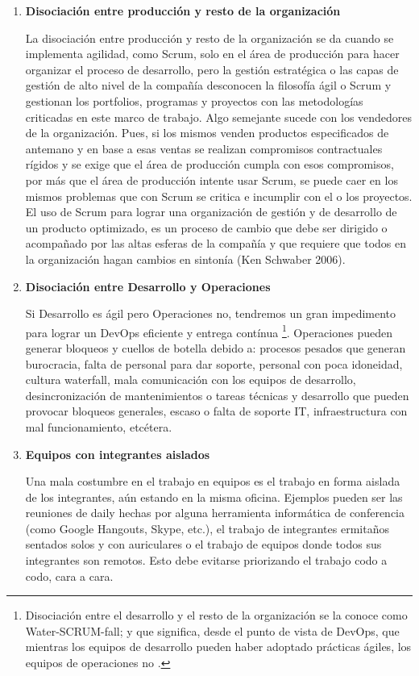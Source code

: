 \begin{enumerate}
\item \textbf{Disociación entre producción y resto de la organización}

La disociación entre producción y resto de la organización se da cuando se implementa agilidad, como Scrum, solo en el área de producción para hacer organizar el proceso de desarrollo, pero la gestión estratégica o las capas de gestión de alto nivel de la compañía desconocen la filosofía ágil o Scrum y gestionan los portfolios, programas y proyectos con las metodologías criticadas en este marco de trabajo. Algo semejante sucede con los vendedores de la organización. Pues, si los mismos venden productos especificados de antemano y en base a esas ventas se realizan compromisos contractuales rígidos y se exige que el área de producción cumpla con esos compromisos, por más que el área de producción intente usar Scrum, se puede caer en los mismos problemas que con Scrum se critica e incumplir con el o los proyectos. El uso de Scrum para lograr una organización de gestión y de desarrollo de un producto optimizado, es un proceso de cambio que debe ser dirigido o acompañado por las altas esferas de la compañía y que requiere que todos en la organización hagan cambios en sintonía (Ken Schwaber 2006).

\item \textbf{Disociación entre Desarrollo y Operaciones}

Si Desarrollo es ágil pero Operaciones no, tendremos un gran impedimento para lograr un DevOps eficiente y entrega contínua \footnote{Disociación entre el desarrollo y el resto de la organización se la conoce como Water-SCRUM-fall; y que significa, desde el punto de vista de DevOps, que mientras los equipos de desarrollo pueden haber adoptado prácticas ágiles, los equipos de operaciones no \cite{DevOps-for-dummies-2015}.}. Operaciones pueden generar bloqueos y cuellos de botella debido a: procesos pesados que generan burocracia, falta de personal para dar soporte, personal con poca idoneidad, cultura waterfall, mala comunicación con los equipos de desarrollo, desincronización de mantenimientos o tareas técnicas y desarrollo que pueden provocar bloqueos generales, escaso o falta de soporte IT, infraestructura con mal funcionamiento, etcétera.

\item \textbf{Equipos con integrantes aislados}

Una mala costumbre en el trabajo en equipos es el trabajo en forma aislada de los integrantes, aún estando en la misma oficina. Ejemplos pueden ser las reuniones de daily hechas por alguna herramienta informática de conferencia (como Google Hangouts, Skype, etc.), el trabajo de integrantes ermitaños sentados solos y con auriculares o el trabajo de equipos donde todos sus integrantes son remotos. Esto debe evitarse priorizando el trabajo codo a codo, cara a cara.


\end{enumerate}

